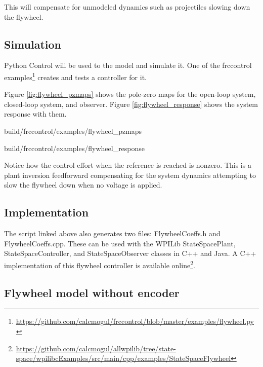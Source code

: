This will compensate for unmodeled dynamics such as projectiles slowing down the
flywheel.

\subsection{Simulation}

Python Control will be used to  the
\gls{model} and simulate it. One of the frccontrol
examples\footnote{\url{https://github.com/calcmogul/frccontrol/blob/master/examples/flywheel.py}}
creates and tests a controller for it.

Figure \ref{fig:flywheel_pzmaps} shows the pole-zero maps for the open-loop
\gls{system}, closed-loop \gls{system}, and \gls{observer}. Figure
\ref{fig:flywheel_response} shows the \gls{system} response with them.

\begin{svg}{build/frccontrol/examples/flywheel_pzmaps}
  \caption{Flywheel pole-zero maps}
  \label{fig:flywheel_pzmaps}
\end{svg}

\begin{svg}{build/frccontrol/examples/flywheel_response}
  \caption{Flywheel response}
  \label{fig:flywheel_response}
\end{svg}

Notice how the \gls{control effort} when the \gls{reference} is reached is
nonzero. This is a plant inversion feedforward compensating for the \gls{system}
dynamics attempting to slow the flywheel down when no voltage is applied.

\subsection{Implementation}

The script linked above also generates two files: FlywheelCoeffs.h and
FlywheelCoeffs.cpp. These can be used with the WPILib StateSpacePlant,
StateSpaceController, and StateSpaceObserver classes in C++ and Java. A C++
implementation of this flywheel controller is available online\footnote{
\url{https://github.com/calcmogul/allwpilib/tree/state-space/wpilibcExamples/src/main/cpp/examples/StateSpaceFlywheel}}.

\subsection{Flywheel model without encoder}
\label{subsec:flywheel_model_without_encoder}

